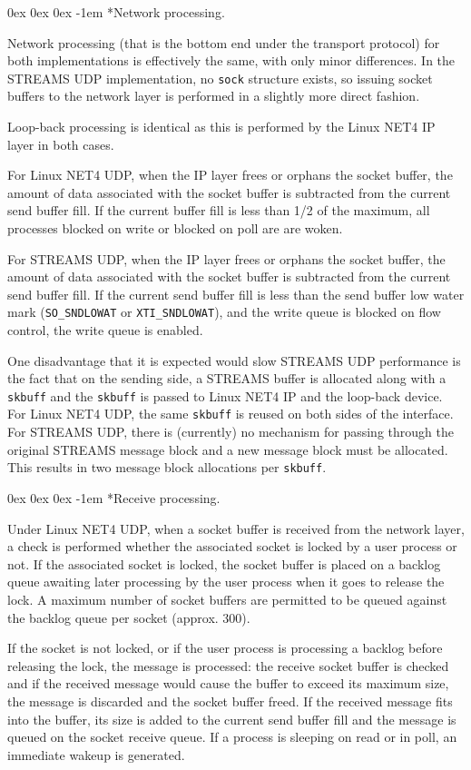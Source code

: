\documentclass[letterpaper,final,notitlepage,twocolumn,10pt,twoside]{article}
\makeatletter
\let\normalsize\small
\let\small\footnotesize
\let\footnotesize\scriptsize
\let\scriptsize\tiny
\renewcommand\subparagraph{\@startsection{subparagraph}{5}{\parindent}%
                                       {0ex \@plus 0ex \@minus 0ex}%
                                       {-1em}%
                                      {\normalfont\normalsize\bfseries\slshape}}
\makeatother
\begin{document}
\subparagraph*{Network processing.}

Network processing (that is the bottom end under the transport protocol) for
both implementations is effectively the same, with only minor differences.  In
the STREAMS UDP implementation, no \texttt{sock} structure exists, so issuing
socket buffers to the network layer is performed in a slightly more direct
fashion.

Loop-back processing is identical as this is performed by the Linux NET4 IP
layer in both cases.

For Linux NET4 UDP, when the IP layer frees or orphans the socket buffer, the
amount of data associated with the socket buffer is subtracted from the
current send buffer fill.  If the current buffer fill is less than 1/2 of the
maximum, all processes blocked on write or blocked on poll are are woken.

For STREAMS UDP, when the IP layer frees or orphans the socket buffer, the
amount of data associated with the socket buffer is subtracted from the
current send buffer fill.  If the current send buffer fill is less than the
send buffer low water mark (\texttt{SO\_SNDLOWAT} or \texttt{XTI\_SNDLOWAT}),
and the write queue is blocked on flow control, the write queue is enabled.

One disadvantage that it is expected would slow STREAMS UDP performance is the
fact that on the sending side, a STREAMS buffer is allocated along with a
\texttt{skbuff} and the \texttt{skbuff} is passed to Linux NET4 IP and the
loop-back device.  For Linux NET4 UDP, the same \texttt{skbuff} is reused on
both sides of the interface.  For STREAMS UDP, there is (currently) no
mechanism for passing through the original STREAMS message block and a new
message block must be allocated.  This results in two message block
allocations per \texttt{skbuff}.

\subparagraph*{Receive processing.}

Under Linux NET4 UDP, when a socket buffer is received from the network layer,
a check is performed whether the associated socket is locked by a user process
or not.  If the associated socket is locked, the socket buffer is placed on a
backlog queue awaiting later processing by the user process when it goes to
release the lock.  A maximum number of socket buffers are permitted to be
queued against the backlog queue per socket (approx. 300).

If the socket is not locked, or if the user process is processing a backlog
before releasing the lock, the message is processed: the receive socket buffer
is checked and if the received message would cause the buffer to exceed its
maximum size, the message is discarded and the socket buffer freed.  If the
received message fits into the buffer, its size is added to the current send
buffer fill and the message is queued on the socket receive queue.  If a
process is sleeping on read or in poll, an immediate wakeup is generated.
\end{document}
